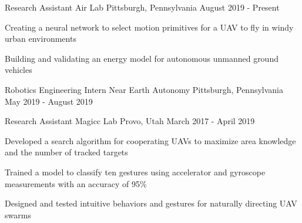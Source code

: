 

\begin{cventries}

    \cventry
    {Research Assistant} %
    {Air Lab} %
    {Pittsburgh, Pennsylvania} %
    {August 2019 - Present} %
    {
      \begin{cvitems}
      \item Creating a neural network to select motion primitives for a UAV to fly in windy urban environments
      \item Building and validating an energy model for autonomous unmanned ground vehicles
      \end{cvitems}
    }  
  
   \scventry
    {Robotics Engineering Intern} %
    {Near Earth Autonomy} %
    {Pittsburgh, Pennsylvania} %
    {May 2019 - August 2019} %

  \cventry
    {Research Assistant}
    {Magicc Lab}
    {Provo, Utah}
    {March 2017 - April 2019}
    {
      \begin{cvitems}
       \item Developed a search algorithm for cooperating UAVs to maximize area knowledge and the number of tracked targets 
         \item Trained a model to classify ten gestures using accelerator and gyroscope measurements with an accuracy of 95\%
         \item Designed and tested intuitive behaviors and gestures for naturally directing UAV swarms
      \end{cvitems}
    }
    

\end{cventries}

